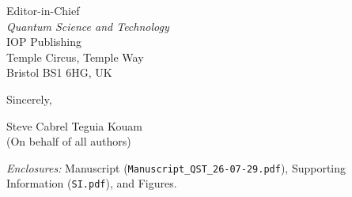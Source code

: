 \documentclass[12pt]{letter}
\begin{document}
\begin{letter}{Editor-in-Chief\\
\textit{Quantum Science and Technology}\\
IOP Publishing\\
Temple Circus, Temple Way\\
Bristol BS1 6HG, UK}
\closing{Sincerely,}

\vspace{0.5em}
Steve Cabrel Teguia Kouam\\
(On behalf of all authors)

\vspace{0.5em}
\noindent\textit{Enclosures:} Manuscript (\texttt{Manuscript\_QST\_26-07-29.pdf}), Supporting Information (\texttt{SI.pdf}), and Figures.

\end{letter}
\end{document}
